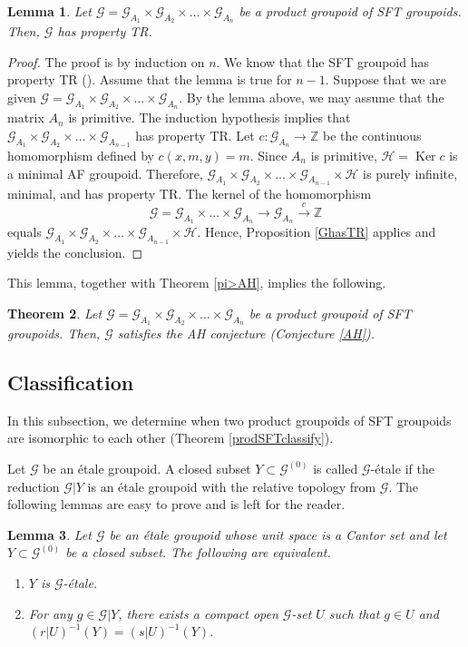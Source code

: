 \documentclass[11pt]{article}
\newtheorem{theorem}{Theorem}[section]
\newtheorem{lemma}[theorem]{Lemma}
\theoremstyle{definition}
\numberwithin{equation}{section}
\newcommand{\Ker}{\operatorname{Ker}}
\newcommand{\G}{\mathcal{G}}
\renewcommand{\H}{\mathcal{H}}
\newcommand{\Z}{\mathbb{Z}}
\begin{document}
\begin{lemma}
Let $\G=\G_{A_1}\times\G_{A_2}\times\dots\times\G_{A_n}$ be 
a product groupoid of SFT groupoids. 
Then, $\G$ has property TR. 
\end{lemma}
\begin{proof}
The proof is by induction on $n$. 
We know that the SFT groupoid has property TR (\cite[Lemma 6.10]{M15crelle}). 
Assume that the lemma is true for $n{-}1$. 
Suppose that 
we are given $\G=\G_{A_1}\times\G_{A_2}\times\dots\times\G_{A_n}$. 
By the lemma above, we may assume that the matrix $A_n$ is primitive. 
The induction hypothesis implies that 
$\G_{A_1}\times\G_{A_2}\times\dots\times\G_{A_{n-1}}$ has property TR. 
Let $c:\G_{A_n}\to\Z$ be the continuous homomorphism 
defined by $c(x,m,y)=m$. 
Since $A_n$ is primitive, $\H=\Ker c$ is a minimal AF groupoid. 
Therefore, 
$\G_{A_1}\times\G_{A_2}\times\dots\times\G_{A_{n-1}}\times\H$ is 
purely infinite, minimal, and has property TR. 
The kernel of the homomorphism 
\[
\G=\G_{A_1}\times\dots\times\G_{A_n}\longrightarrow
\G_{A_n}\stackrel{c}{\longrightarrow}\Z
\]
equals $\G_{A_1}\times\G_{A_2}\times\dots\times\G_{A_{n-1}}\times\H$. 
Hence, Proposition \ref{GhasTR} applies and yields the conclusion. 
\end{proof}

This lemma, together with Theorem \ref{pi>AH}, implies the following. 

\begin{theorem}\label{prodSFTAH}
Let $\G=\G_{A_1}\times\G_{A_2}\times\dots\times\G_{A_n}$ be 
a product groupoid of SFT groupoids. 
Then, $\G$ satisfies the AH conjecture (Conjecture \ref{AH}). 
\end{theorem}




\subsection{Classification}

In this subsection, we determine 
when two product groupoids of SFT groupoids are isomorphic to each other 
(Theorem \ref{prodSFTclassify}). 

Let $\G$ be an \'etale groupoid. 
A closed subset $Y\subset\G^{(0)}$ is called $\G$-\'etale 
if the reduction $\G|Y$ is an \'etale groupoid 
with the relative topology from $\G$. 
The following lemmas are easy to prove and is left for the reader. 

\begin{lemma}
Let $\G$ be an \'etale groupoid whose unit space is a Cantor set and 
let $Y\subset\G^{(0)}$ be a closed subset. 
The following are equivalent. 
\begin{enumerate}
\item $Y$ is $\G$-\'etale. 
\item For any $g\in\G|Y$, there exists a compact open $\G$-set $U$ 
such that $g\in U$ and $(r|U)^{-1}(Y)=(s|U)^{-1}(Y)$. 
\end{enumerate}
\end{lemma}
\end{document}
